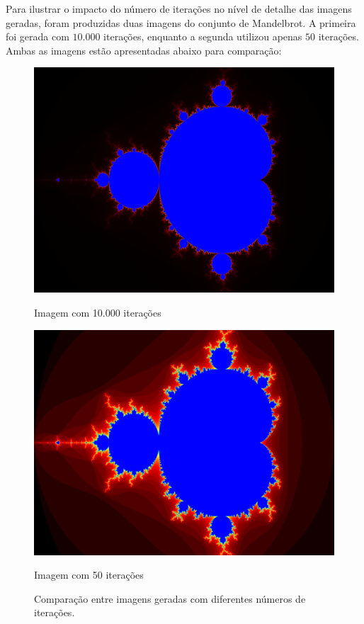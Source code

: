 Para ilustrar o impacto do número de iterações no nível de detalhe das imagens geradas, foram produzidas duas imagens do conjunto de Mandelbrot. A primeira foi gerada com \( 10.000 \) iterações, enquanto a segunda utilizou apenas \( 50 \) iterações. Ambas as imagens estão apresentadas abaixo para comparação:
\begin{figure}[H]
    \centering
    \begin{minipage}{0.49\textwidth}
        \centering
        \includegraphics[width=\textwidth]{figures/comparacao/mandelbrot_10000.png}
        \caption*{Imagem com 10.000 iterações}
    \end{minipage}
    \hfill
    \begin{minipage}{0.49\textwidth}
        \centering
        \includegraphics[width=\textwidth]{figures/comparacao/mandelbrot_50.png}
        \caption*{Imagem com 50 iterações}
    \end{minipage}
    \caption{Comparação entre imagens geradas com diferentes números de iterações.}
    \label{fig:comparison_iterations}
\end{figure}

